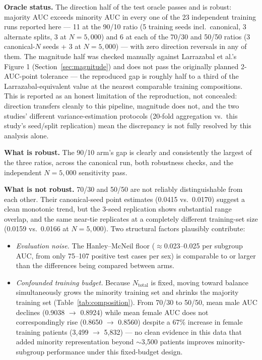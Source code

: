 \documentclass[11pt]{article}
\begin{document}
\textbf{Oracle status.} The direction half of the test oracle passes and is robust: majority AUC exceeds minority AUC in every one of the 23 independent training runs reported here — 11 at the 90/10 ratio (5 training seeds incl.\ canonical, 3 alternate splits, 3 at $N=5{,}000$) and 6 at each of the 70/30 and 50/50 ratios (3 canonical-$N$ seeds + 3 at $N=5{,}000$) — with zero direction reversals in any of them. The magnitude half was checked manually against Larrazabal et al.'s Figure 1 (Section~\ref{sec:magnitude}) and does not pass the originally planned 2-AUC-point tolerance — the reproduced gap is roughly half to a third of the Larrazabal-equivalent value at the nearest comparable training compositions. This is reported as an honest limitation of the reproduction, not concealed: direction transfers cleanly to this pipeline, magnitude does not, and the two studies' different variance-estimation protocols (20-fold aggregation vs.\ this study's seed/split replication) mean the discrepancy is not fully resolved by this analysis alone.

\textbf{What is robust.} The 90/10 arm's gap is clearly and consistently the largest of the three ratios, across the canonical run, both robustness checks, and the independent $N=5{,}000$ sensitivity pass.

\textbf{What is not robust.} 70/30 and 50/50 are not reliably distinguishable from each other. Their canonical-seed point estimates (0.0415 vs.\ 0.0170) suggest a clean monotonic trend, but the 3-seed replication shows substantial range overlap, and the same near-tie replicates at a completely different training-set size (0.0159 vs.\ 0.0166 at $N=5{,}000$). Two structural factors plausibly contribute:
\begin{itemize}
\item \emph{Evaluation noise.} The Hanley--McNeil floor ($\approx$0.023--0.025 per subgroup AUC, from only 75--107 positive test cases per sex) is comparable to or larger than the differences being compared between arms.
\item \emph{Confounded training budget.} Because $N_{\text{total}}$ is fixed, moving toward balance simultaneously grows the minority training set and shrinks the majority training set (Table~\ref{tab:composition}). From 70/30 to 50/50, mean male AUC declines (0.9038 $\to$ 0.8924) while mean female AUC does not correspondingly rise (0.8650 $\to$ 0.8560) despite a 67\% increase in female training patients (3{,}499 $\to$ 5{,}832) — no clean evidence in this data that added minority representation beyond $\sim$3{,}500 patients improves minority-subgroup performance under this fixed-budget design.
\end{itemize}
\end{document}
